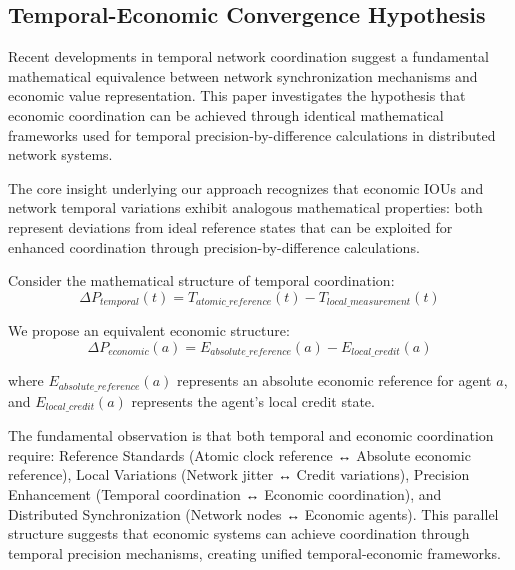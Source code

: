\documentclass[12pt,a4paper]{article}
\begin{document}
\subsection{Temporal-Economic Convergence Hypothesis}

Recent developments in temporal network coordination suggest a fundamental mathematical equivalence between network synchronization mechanisms and economic value representation. This paper investigates the hypothesis that economic coordination can be achieved through identical mathematical frameworks used for temporal precision-by-difference calculations in distributed network systems.

The core insight underlying our approach recognizes that economic IOUs and network temporal variations exhibit analogous mathematical properties: both represent deviations from ideal reference states that can be exploited for enhanced coordination through precision-by-difference calculations.

Consider the mathematical structure of temporal coordination:
\begin{equation}
\Delta P_{temporal}(t) = T_{atomic\_reference}(t) - T_{local\_measurement}(t)
\end{equation}

We propose an equivalent economic structure:
\begin{equation}
\Delta P_{economic}(a) = E_{absolute\_reference}(a) - E_{local\_credit}(a)
\end{equation}

where $E_{absolute\_reference}(a)$ represents an absolute economic reference for agent $a$, and $E_{local\_credit}(a)$ represents the agent's local credit state.

The fundamental observation is that both temporal and economic coordination require: Reference Standards (Atomic clock reference ↔ Absolute economic reference), Local Variations (Network jitter ↔ Credit variations), Precision Enhancement (Temporal coordination ↔ Economic coordination), and Distributed Synchronization (Network nodes ↔ Economic agents). This parallel structure suggests that economic systems can achieve coordination through temporal precision mechanisms, creating unified temporal-economic frameworks.
\end{document}
